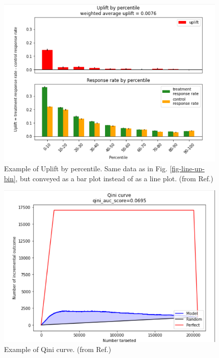 \begin{figure}[h!]
\centering
\includegraphics[width=5in]
{uplift/bar-uplift-binned.png}
\caption{Example of Uplift by percentile. 
Same data as in Fig. \ref{fig-line-up-bin},
but conveyed as a bar plot
instead of as a line plot.
(from Ref.\cite{scikit-uplift})}
\label{fig-bar-up-bin}
\end{figure}

\begin{figure}[h!]
\centering
\includegraphics[width=5in]
{uplift/qini.png}
\caption{Example of Qini curve.
(from Ref.\cite{scikit-uplift})}
\label{fig-qini}
\end{figure}



